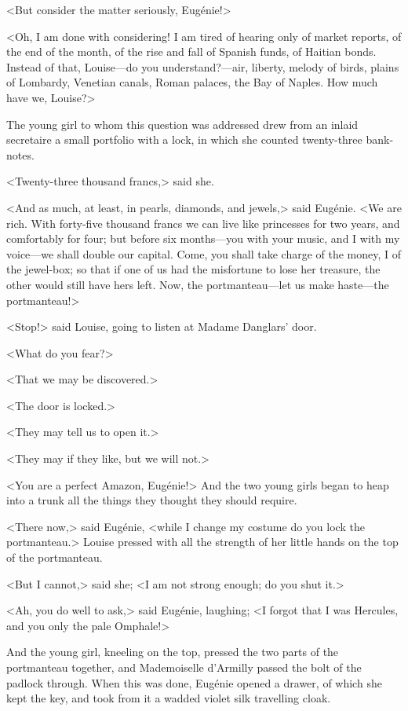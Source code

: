  <But consider the matter seriously, Eugénie!> 

 <Oh, I am done with considering! I am tired of hearing only of market reports, of the end of the month, of the rise and fall of Spanish funds, of Haitian bonds. Instead of that, Louise—do you understand?—air, liberty, melody of birds, plains of Lombardy, Venetian canals, Roman palaces, the Bay of Naples. How much have we, Louise?> 

 The young girl to whom this question was addressed drew from an inlaid secretaire a small portfolio with a lock, in which she counted twenty-three bank-notes. 

 <Twenty-three thousand francs,> said she. 

 <And as much, at least, in pearls, diamonds, and jewels,> said Eugénie. <We are rich. With forty-five thousand francs we can live like princesses for two years, and comfortably for four; but before six months—you with your music, and I with my voice—we shall double our capital. Come, you shall take charge of the money, I of the jewel-box; so that if one of us had the misfortune to lose her treasure, the other would still have hers left. Now, the portmanteau—let us make haste—the portmanteau!> 

 <Stop!> said Louise, going to listen at Madame Danglars' door. 

 <What do you fear?> 

 <That we may be discovered.> 

 <The door is locked.> 

 <They may tell us to open it.> 

 <They may if they like, but we will not.> 

 <You are a perfect Amazon, Eugénie!> And the two young girls began to heap into a trunk all the things they thought they should require. 

 <There now,> said Eugénie, <while I change my costume do you lock the portmanteau.> Louise pressed with all the strength of her little hands on the top of the portmanteau. 

 <But I cannot,> said she; <I am not strong enough; do you shut it.> 

 <Ah, you do well to ask,> said Eugénie, laughing; <I forgot that I was Hercules, and you only the pale Omphale!> 

 And the young girl, kneeling on the top, pressed the two parts of the portmanteau together, and Mademoiselle d'Armilly passed the bolt of the padlock through. When this was done, Eugénie opened a drawer, of which she kept the key, and took from it a wadded violet silk travelling cloak. 

